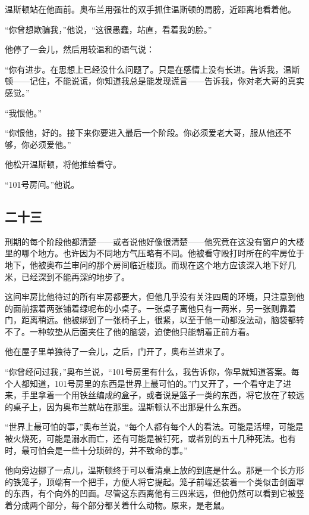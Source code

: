温斯顿站在他面前。奥布兰用强壮的双手抓住温斯顿的肩膀，近距离地看着他。

``你曾想欺骗我，''他说，``这很愚蠢，站直，看着我的脸。''

他停了一会儿，然后用较温和的语气说：

``你有进步。在思想上已经没什么问题了。只是在感情上没有长进。告诉我，温斯顿------记住，不能说谎，你知道我总是能发现谎言------告诉我，你对老大哥的真实感觉。''

``我恨他。''

``你恨他，好的。接下来你要进入最后一个阶段。你必须爱老大哥，服从他还不够，你必须爱他。''

他松开温斯顿，将他推给看守。

``101号房间。''他说。

\subsection{二十三}\label{ux4e8cux5341ux4e09}

刑期的每个阶段他都清楚------或者说他好像很清楚------他究竟在这没有窗户的大楼里的哪个地方。也许因为不同地方气压略有不同。他被看守殴打时所在的牢房位于地下，他被奥布兰审问的那个房间临近楼顶。而现在这个地方应该深入地下好几米，已经深到不能再深的地步了。

这间牢房比他待过的所有牢房都要大，但他几乎没有关注四周的环境，只注意到他的面前摆着两张铺着绿呢布的小桌子。一张桌子离他只有一两米，另一张则靠着门，距离稍远。他被绑到了一张椅子上，很紧，以至于他一动都没法动，脑袋都转不了。一种软垫从后面夹住了他的脑袋，迫使他只能朝着正前方看。

他在屋子里单独待了一会儿，之后，门开了，奥布兰进来了。

``你曾经问过我，''奥布兰说，``101号房里有什么，我告诉你，你早就知道答案。每个人都知道，101号房里的东西是世界上最可怕的。''门又开了，一个看守走了进来，手里拿着一个用铁丝编成的盒子，或者说是篮子一类的东西，将它放在了较远的桌子上，因为奥布兰就站在那里。温斯顿认不出那是什么东西。

``世界上最可怕的事，''奥布兰说，``每个人都有每个人的看法。可能是活埋，可能是被火烧死，可能是溺水而亡，还有可能是被钉死，或者别的五十几种死法。也有时，最可怕会是一些十分琐碎的，并不致命的事。''

他向旁边挪了一点儿，温斯顿终于可以看清桌上放的到底是什么。那是一个长方形的铁笼子，顶端有一个把手，方便人将它提起。笼子前端还装着一个类似击剑面罩的东西，有个向外的凹面。尽管这东西离他有三四米远，但他仍然可以看到它被竖着分成两个部分，每个部分都关着什么动物。原来，是老鼠。

